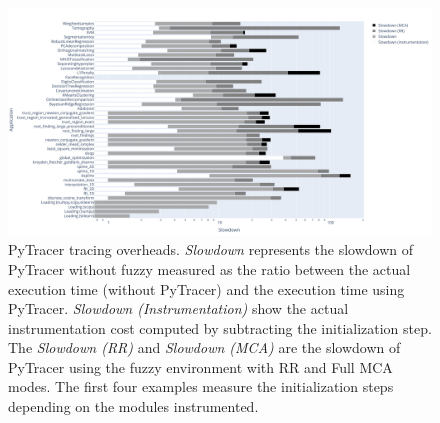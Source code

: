 \documentclass[11pt]{article}
\newcommand{\tristan}[1]{\color{orange}\textbf{From Tristan:} #1\color{black}\xspace}
\newcommand{\pytracer}[0]{PyTracer\xspace}
\begin{document}
\begin{figure}
    \centering
    \includegraphics[width=\linewidth]{figure/performance.pdf}
    \caption{
    \pytracer tracing overheads. \textit{Slowdown} represents the slowdown of \pytracer without fuzzy measured as the ratio between the actual execution time (without \pytracer) and the execution time using \pytracer. 
    \textit{Slowdown (Instrumentation)} show the actual instrumentation cost computed by subtracting the initialization step.
    The \textit{Slowdown (RR)} and \textit{Slowdown (MCA)} are the slowdown of \pytracer 
    using the fuzzy environment with RR and Full MCA modes.
    The first four examples measure the initialization steps depending on the modules instrumented. 
    }
    \label{fig:performance_tracing}
\end{figure}


\end{document}
